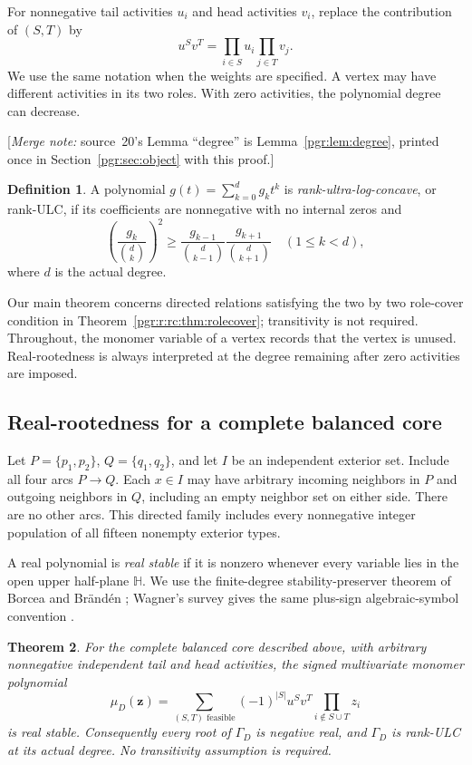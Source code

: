 \documentclass[11pt]{article}
\numberwithin{equation}{section}
\newtheorem{theorem}{Theorem}[section]\newtheorem{lemma}[theorem]{Lemma}\newtheorem{proposition}[theorem]{Proposition}\newtheorem{corollary}[theorem]{Corollary}
\theoremstyle{definition}\newtheorem{definition}[theorem]{Definition}\newtheorem{remark}[theorem]{Remark}
\newcommand{\Ga}{\Gamma}                   %
\newcommand{\HH}{\mathbb H}                %
\newcommand{\mnote}[1]{[\textit{Merge note:} #1]}
\begin{document}
For nonnegative tail activities $u_i$ and head activities $v_i$, replace the contribution of $(S,T)$ by
\[
 u^S v^T=\prod_{i\in S}u_i\prod_{j\in T}v_j.
\]
We use the same notation when the weights are specified. A vertex may have different activities in its two roles. With zero activities, the polynomial degree can decrease.


\mnote{source~20's Lemma ``degree'' is Lemma~\ref{pgr:lem:degree}, printed
once in Section~\ref{pgr:sec:object} with this proof.}


\begin{definition}
A polynomial $g(t)=\sum_{k=0}^d g_k t^k$ is \emph{rank-ultra-log-concave}, or rank-ULC, if its coefficients are nonnegative with no internal zeros and
\[
 \left(\frac{g_k}{\binom dk}\right)^2\ge
 \frac{g_{k-1}}{\binom d{k-1}}\frac{g_{k+1}}{\binom d{k+1}}
 \quad(1\le k<d),
\]
where $d$ is the actual degree.
\end{definition}

Our main theorem concerns directed relations satisfying the two by two role-cover condition in Theorem~\ref{pgr:r:rc:thm:rolecover}; transitivity is not required. Throughout, the monomer variable of a vertex records that the vertex is unused. Real-rootedness is always interpreted at the degree remaining after zero activities are imposed.
\subsection{Real-rootedness for a complete balanced core}
Let $P=\{p_1,p_2\}$, $Q=\{q_1,q_2\}$, and let $I$ be an independent exterior set. Include all four arcs $P\to Q$. Each $x\in I$ may have arbitrary incoming neighbors in $P$ and outgoing neighbors in $Q$, including an empty neighbor set on either side. There are no other arcs. This directed family includes every nonnegative integer population of all fifteen nonempty exterior types.

A real polynomial is \emph{real stable} if it is nonzero whenever every variable lies in the open upper half-plane $\HH$. We use the finite-degree stability-preserver theorem of Borcea and Br\"and\'en \cite{BB}; Wagner's survey gives the same plus-sign algebraic-symbol convention \cite[Theorem 5.2]{WagnerSurvey}.

\begin{theorem}\label{pgr:r:rc:thm:balanced}
For the complete balanced core described above, with arbitrary nonnegative independent tail and head activities, the signed multivariate monomer polynomial
\[
 \mu_D(\mathbf z)=\sum_{(S,T)\text{ feasible}}(-1)^{|S|}u^S v^T
                   \prod_{i\notin S\cup T}z_i
\]
is real stable. Consequently every root of $\Ga_D$ is negative real, and $\Ga_D$ is rank-ULC at its actual degree. No transitivity assumption is required.
\end{theorem}
\end{document}
